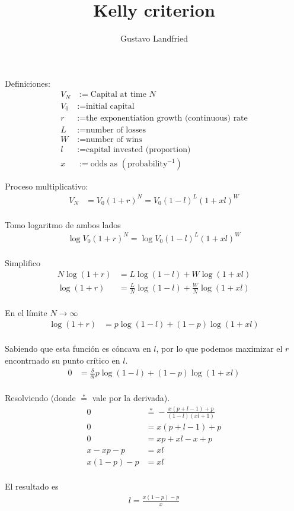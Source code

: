\documentclass[a4paper,10pt]{article}
\title{Kelly criterion}
\author{Gustavo Landfried}
\begin{document}
\maketitle

\section{}

Definiciones:
\begin{align*}
V_N & := \text{Capital at time } N \\
V_0 & := \text{initial capital} \\
r & := \text{the exponentiation growth (continuous) rate} \\
L &:= \text{number of losses} \\
W &:= \text{number of wins} \\
l & := \text{capital invested (proportion)} \\
x & := \text{odds as } (\text{probability}^{-1})
\end{align*}

Proceso multiplicativo:
\begin{align}
 V_N & = V_0 (1+r)^N = V_0 (1-l)^L (1+xl)^W \\
\end{align}

Tomo logaritmo de ambos lados
\begin{align}
 \log V_0 (1+r)^N = \log V_0 (1-l)^L (1+xl)^W \\
\end{align}

Simplifico
\begin{align}
 N \log (1+r) &= L \log (1-l) + W \log (1+xl) \\
 \log (1+r) &= \frac{L}{N} \log (1-l) + \frac{W}{N} \log (1+xl) \\
\end{align}

En el límite $N \rightarrow \infty$
\begin{align}
 \log (1+r) &= p \log (1-l) + (1-p) \log (1+xl) \\
\end{align}

Sabiendo que esta función es cóncava en $l$, por lo que podemos maximizar el $r$ encontrnado su punto crítico en $l$.
\begin{align}
0 &= \frac{\delta}{\delta l} p \log (1-l) + (1-p) \log (1+xl) \\
\end{align}

Resolviendo (donde $\overset{*}{=}$ vale por la derivada).
\begin{align}
0 &\overset{*}{=} - \frac{x (p+l-1) + p}{(1-l)(xl+1)} \\
0 &=  x (p+l-1) + p \\
0 &=  xp+xl-x + p \\
x - xp - p &=  xl \\
x(1 - p) - p &=  xl \\
\end{align}

El resultado es
\begin{align}
 l = \frac{x(1 - p) - p}{x}
\end{align}
\end{document}
